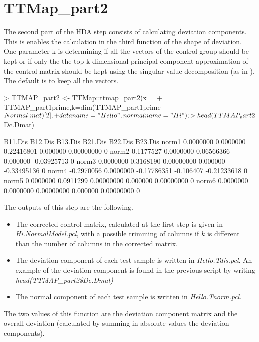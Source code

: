 \documentclass[a4paper,12pt]{article}
\begin{document}
\section{TTMap\_part2}
The second part of the HDA step consists of calculating deviation 
components. This is enables the calculation in the third function of the 
shape of deviation. One parameter k is determining if all the vectors of the 
control group should be kept or if only the the top k-dimensional principal 
component approximation of the control matrix should be kept using the 
singular value decomposition (as in \cite{Monica}). The default is to keep 
all 
the vectors.
\begin{scriptsize}
\begin{Schunk}
\begin{Sinput}
> TTMAP_part2 <- TTMap::ttmap_part2(x = 
+ TTMAP_part1prime,k=dim(TTMAP_part1prime$Normal.mat)[2],
+ dataname = "Hello", normalname = "Hi");
> head(TTMAP_part2$Dc.Dmat)
\end{Sinput}
\begin{Soutput}
B11.Dis   B12.Dis     B13.Dis   B21.Dis     B22.Dis B23.Dis
norm1  0.0000000 0.0000000  0.22416801  0.000000  0.00000000       0
norm2  0.1177527 0.0000000  0.06566366  0.000000 -0.03925713       0
norm3  0.0000000 0.3168190  0.00000000  0.000000 -0.33495136       0
norm4 -0.2970056 0.0000000 -0.17786351 -0.106407 -0.21233618       0
norm5  0.0000000 0.0911299  0.00000000  0.000000  0.00000000       0
norm6  0.0000000 0.0000000  0.00000000  0.000000  0.00000000       0
\end{Soutput}
\end{Schunk}
\end{scriptsize}
The outputs of this step are the following. 
\begin{itemize}
\item The corrected control matrix, calculated at the first step is given in 
\textit{Hi.NormalModel.pcl}, with a possible trimming of columns if $k$ is 
different than the number of columns in the corrected matrix.
\item The deviation component of each test sample is written in 
\textit{Hello.Tdis.pcl}. An example of the deviation component is found in 
the previous script by writing \textit{head(TTMAP\_part2\$Dc.Dmat)}
\item The normal component of each test sample is written in 
\textit{Hello.Tnorm.pcl}.
\end{itemize}
The two values of this function are the deviation component matrix and 
the 
overall deviation (calculated by summing in absolute values the deviation 
components).
\end{document}
